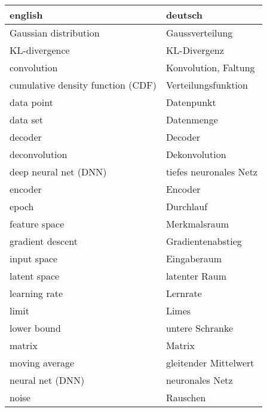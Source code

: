 \documentclass{mlthesis}
\begin{document}
\begin{center}
  \begin{tabular}{|l|l|}
    \hline 
    english                            & deutsch                   \\
    \hline
    Gaussian distribution              & Gaussverteilung           \\
    KL-divergence                      & KL-Divergenz              \\
    convolution                        & Konvolution, Faltung      \\
    cumulative density function (CDF)  & Verteilungsfunktion       \\
    data point                         & Datenpunkt                \\
    data set                           & Datenmenge                \\
    decoder                            & Decoder                   \\
    deconvolution                      & Dekonvolution             \\
    deep neural net (DNN)              & tiefes neuronales Netz    \\
    encoder                            & Encoder                   \\
    epoch                              & Durchlauf                 \\
    feature space                      & Merkmalsraum              \\
    gradient descent                   & Gradientenabstieg         \\
    input space                        & Eingaberaum               \\
    latent space                       & latenter Raum             \\
    learning rate                      & Lernrate                  \\
    limit                              & Limes                     \\
    lower bound                        & untere Schranke           \\
    matrix                             & Matrix                    \\
    moving average                     & gleitender Mittelwert     \\
    neural net (DNN)                   & neuronales Netz           \\
    noise                              & Rauschen                  \\

\end{tabular}
\end{center}
\end{document}
